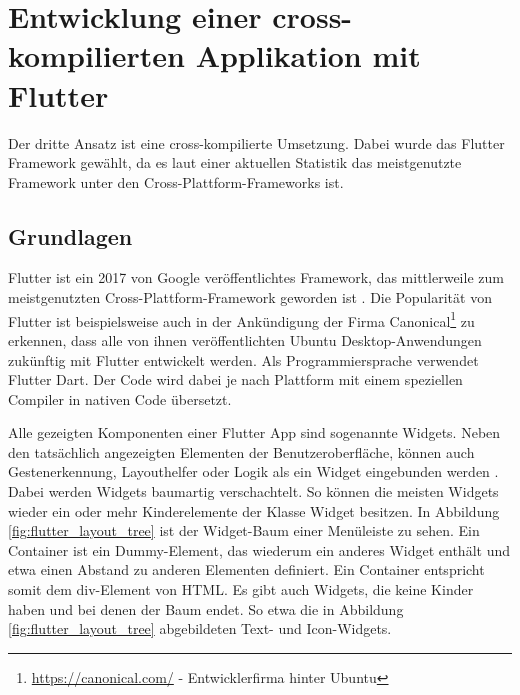 \section{Entwicklung einer cross-kompilierten Applikation mit Flutter}
Der dritte Ansatz ist eine cross-kompilierte Umsetzung. Dabei wurde das Flutter Framework gewählt, da es laut einer aktuellen Statistik \cite{statist_CP_Framework} das meistgenutzte Framework unter den Cross-Plattform-Frameworks ist.

\subsection{Grundlagen}
\label{cha:4_3_1}
Flutter ist ein 2017 von Google veröffentlichtes Framework, das mittlerweile zum meistgenutzten Cross-Plattform-Framework geworden ist \cite{statist_CP_Framework}. Die Popularität von Flutter ist beispielsweise auch in der Ankündigung der Firma Canonical\footnote{\url{https://canonical.com/} - Entwicklerfirma hinter Ubuntu} zu erkennen, dass alle von ihnen veröffentlichten Ubuntu Desktop-Anwendungen zukünftig mit Flutter entwickelt werden\cite{Ubuntu_Flutter}. Als Programmiersprache verwendet Flutter Dart. Der Code wird dabei je nach Plattform mit einem speziellen Compiler in nativen Code übersetzt\cite{flutter_compilation}.

Alle gezeigten Komponenten einer Flutter App sind sogenannte Widgets. Neben den tatsächlich angezeigten Elementen der Benutzeroberfläche, können auch Gestenerkennung, Layouthelfer oder Logik als ein Widget eingebunden werden \cite{Thiele_2018}. Dabei werden Widgets baumartig verschachtelt. So können die meisten Widgets wieder ein oder mehr Kinderelemente der Klasse Widget besitzen. In Abbildung \ref{fig:flutter_layout_tree} ist der Widget-Baum einer Menüleiste zu sehen. Ein Container ist ein Dummy-Element, das wiederum ein anderes Widget enthält und etwa einen Abstand zu anderen Elementen definiert. Ein Container entspricht somit dem div-Element von HTML. Es gibt auch Widgets, die keine Kinder haben und bei denen der Baum endet. So etwa die in Abbildung \ref{fig:flutter_layout_tree} abgebildeten Text- und Icon-Widgets.

